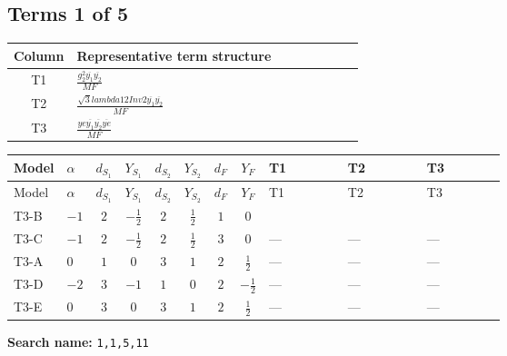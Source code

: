 \documentclass[8pt]{article}
\begin{document}
\begin{landscape}
\subsection*{Terms 1 of 5}
\begin{center}
\begin{tabular}{@{}c >{\raggedright\arraybackslash}p{0.82\linewidth}@{}}
\toprule
Column & Representative term structure \\
\midrule
T1 & \(\displaystyle \frac{g_{2}^{2} \overline{y_{1}} \overline{y_{2}}}{MF}\) \\
\midrule
T2 & \(\displaystyle \frac{\sqrt{3} lambda12Inv2 \overline{y_{1}} \overline{y_{2}}}{MF}\) \\
\midrule
T3 & \(\displaystyle \frac{ye \overline{y_{1}} \overline{y_{2}} \overline{ye}}{MF}\) \\
\midrule
\bottomrule
\end{tabular}
\end{center}
\smallskip
\tiny
\begin{longtable}{@{}llcccccc >{\raggedright\arraybackslash}p{0.21\linewidth} >{\raggedright\arraybackslash}p{0.21\linewidth} >{\raggedright\arraybackslash}p{0.21\linewidth}@{}}
\toprule
Model & $\alpha$ & $d_{S_1}$ & $Y_{S_1}$ & $d_{S_2}$ & $Y_{S_2}$ & $d_F$ & $Y_F$ & T1 & T2 & T3 \\
\midrule
\endfirsthead
\toprule
Model & $\alpha$ & $d_{S_1}$ & $Y_{S_1}$ & $d_{S_2}$ & $Y_{S_2}$ & $d_F$ & $Y_F$ & T1 & T2 & T3 \\
\midrule
\endhead
T3-B & $-1$ & $2$ & $-\frac{1}{2}$ & $2$ & $\frac{1}{2}$ & $1$ & $0$ & \scriptsize\adjustbox{max width=\linewidth}{$\begin{gathered} - \frac{3 g_{2}^{2} \overline{y_{1}} \overline{y_{2}}}{4 MF}\end{gathered}$} & \scriptsize\adjustbox{max width=\linewidth}{$\begin{gathered} - \frac{\sqrt{3} lambda12Inv2 \overline{y_{1}} \overline{y_{2}}}{3 MF}\end{gathered}$} & \scriptsize\adjustbox{max width=\linewidth}{$\begin{gathered} \frac{ye \overline{y_{1}} \overline{y_{2}} \overline{ye}}{4 MF}\end{gathered}$} \\
\midrule
T3-C & $-1$ & $2$ & $-\frac{1}{2}$ & $2$ & $\frac{1}{2}$ & $3$ & $0$ & --- & --- & --- \\
\midrule
T3-A & $0$ & $1$ & $0$ & $3$ & $1$ & $2$ & $\frac{1}{2}$ & --- & --- & --- \\
\midrule
T3-D & $-2$ & $3$ & $-1$ & $1$ & $0$ & $2$ & $-\frac{1}{2}$ & --- & --- & --- \\
\midrule
T3-E & $0$ & $3$ & $0$ & $3$ & $1$ & $2$ & $\frac{1}{2}$ & --- & --- & --- \\
\midrule
\bottomrule
\end{longtable}
\clearpage
\noindent\textbf{Search name: }\texttt{1,1,5,11}\par\smallskip

\end{landscape}
\end{document}
